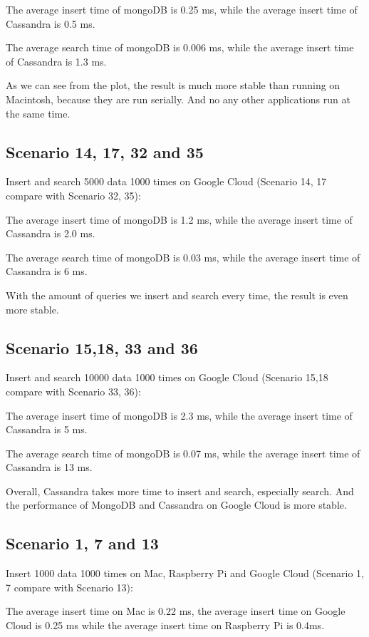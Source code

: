 The average insert time of mongoDB is 0.25 ms, while the average insert time of 
Cassandra is 0.5 ms.

The average search time of mongoDB is 0.006 ms, while the average 
insert time of 
Cassandra is 1.3 ms.

As we can see from the plot, the result is much more stable than running 
on Macintosh, 
because they are run serially. And no any other applications run at the same time. 

\subsection{Scenario 14, 17, 32 and 35}
Insert and search 5000 data 1000 times on Google Cloud 
(Scenario 14, 17 compare with Scenario 32, 35):

The average insert time of mongoDB is 1.2 ms, while the average insert time of 
Cassandra is 2.0 ms.

The average search time of mongoDB is 0.03 ms, while the average 
insert time of 
Cassandra is 6 ms.

With the amount of queries we insert and search every time,
the result is even more stable. 

\subsection{Scenario 15,18, 33 and 36}
Insert and search 10000 data 1000 times on Google Cloud 
(Scenario 15,18 compare with Scenario 33, 36):

The average insert time of mongoDB is 2.3 ms, while the average insert time of 
Cassandra is 5 ms.

The average search time of mongoDB is 0.07 ms, while the average
 insert time of 
Cassandra is 13 ms.

Overall, Cassandra takes more time to insert and search, especially search. 
And the performance of MongoDB and Cassandra on Google Cloud is 
more stable.


\subsection{Scenario 1, 7 and 13}
Insert 1000 data 1000 times on Mac, Raspberry Pi and Google Cloud
(Scenario 1, 7  compare with Scenario 13):

The average insert time on Mac  is 0.22 ms, the average insert time on 
Google Cloud
 is 0.25 ms while the average insert time on  Raspberry Pi is 0.4ms.

